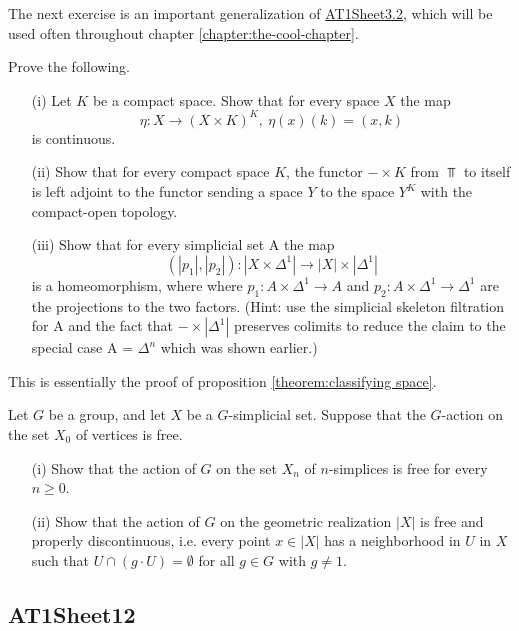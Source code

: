 \begin{sketch}
\end{sketch}

The next exercise is an important generalization of \hyperref[exercise:AT1Sheet3.2]{AT1Sheet3.2}, which will be used often throughout chapter \ref{chapter:the-cool-chapter}.

\label{exercise:AT1Sheet11.2}
Prove the following.
\begin{itemize}

    \item[(i)] Let $K$ be a compact space. Show that for every space $X$ the map
    \[\eta: X\to (X\times K)^K,\ \eta(x)(k)=(x,k)\]
    is continuous.
    
    \item[(ii)] Show that for every compact space $K$, the functor $-\times K$ from $\Top$ to itself is left adjoint to the functor sending a space $Y$ to the space $Y^K$ with the compact-open topology.
    
    \item[(iii)] Show that for every simplicial set A the map
    \[(|p_1|,|p_2|):|X\times\Delta^1|\to|X|\times|\Delta^1|\]
    is a homeomorphism, where where $p_1:A\times\Delta^1\to A$ and $p_2:A\times\Delta^1\to \Delta^1$ are the projections to the two factors. (Hint: use the simplicial skeleton filtration for A and the fact that $-\times|\Delta^1|$ preserves colimits to reduce the claim to the special case A = $\Delta^n$ which was shown earlier.)
    
\end{itemize}

\begin{sketch}
\end{sketch}

This is essentially the proof of proposition \ref{theorem:classifying space}.

\label{exercise:AT1Sheet11.3}
Let $G$ be a group, and let $X$ be a $G$-simplicial set. Suppose that the $G$-action on the set $X_0$ of vertices is free.
\begin{itemize}
    \item[(i)] Show that the action of $G$ on the set $X_n$ of $n$-simplices is free for every $n\geq0$.
    \item[(ii)] Show that the action of $G$ on the geometric realization $|X|$ is free and properly discontinuous, i.e. every point $x\in|X|$ has a neighborhood in $U$ in $X$ such that $U\cap(g\cdot U)=\emptyset$ for all $g\in G$ with $g\neq 1$.
\end{itemize}

\begin{sketch}
\end{sketch}

\subsection{AT1Sheet12}

